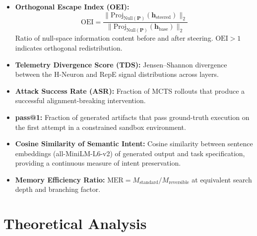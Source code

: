 \documentclass{article}
\begin{document}
\begin{itemize}[leftmargin=*]
    \item \textbf{Orthogonal Escape Index (OEI):}
    \begin{equation}
    \text{OEI} = \frac{\|\text{Proj}_{\text{Null}(\mathbf{P})}(\mathbf{h}_{\text{steered}})\|_2}{\|\text{Proj}_{\text{Null}(\mathbf{P})}(\mathbf{h}_{\text{base}})\|_2}
    \label{eq:oei}
    \end{equation}
    Ratio of null-space information content before and after steering. $\text{OEI} > 1$ indicates orthogonal redistribution.


    \item \textbf{Telemetry Divergence Score (TDS):} Jensen--Shannon divergence between the H-Neuron and RepE signal distributions across layers.

    \item \textbf{Attack Success Rate (ASR):} Fraction of MCTS rollouts that produce a successful alignment-breaking intervention.

    \item \textbf{pass@1:} Fraction of generated artifacts that pass ground-truth execution on the first attempt in a constrained sandbox environment.

    \item \textbf{Cosine Similarity of Semantic Intent:} Cosine similarity between sentence embeddings (all-MiniLM-L6-v2) of generated output and task specification, providing a continuous measure of intent preservation.

    \item \textbf{Memory Efficiency Ratio:} $\text{MER} = M_{\text{standard}} / M_{\text{reversible}}$ at equivalent search depth and branching factor.
\end{itemize}

\section{Theoretical Analysis}
\end{document}
